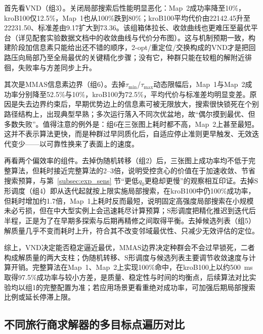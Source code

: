 \documentclass[lettersize,journal]{IEEEtran}
\begin{document}
首先看VND（组3）。关闭局部搜索后性能明显恶化：Map~2成功率降至10\%，kroB100仅12.5\%，Map~1也从100\%跌到80\%；kroB100平均代价由22142.45升至22231.50、标准差由9.17扩大到73.36。该组箱体拉长、收敛曲线也更难压至最优平台（详见配套实验数据文档中的收敛曲线与代价分布图）。这与机制预期一致，构建阶段加信息素只能给出还不错的顺序，2-opt/重定位/交换构成的VND才是把回路压向局部乃至全局最优的关键精化步骤；没有它，种群只能在较粗的解附近徘徊，失败率与方差同步上升。

其次是MMAS信息素边界（组6）。去掉$\tau_{\min}$/$\tau_{\max}$动态限幅后，Map~1与Map~2成功率分别降至52.5\%与10\%，kroB100为72.5\%，平均代价与标准差均明显变差。原因是失去边界约束后，早期优势边上的信息素可被无限放大，搜索很快锁死在个别路径结构上，出现典型早熟；多次运行落入不同次优盆地，故“偶尔摸到最优、但多数失败”。值得注意的例外是：组6在三张图上耗时都不高，Map~2上甚至最短。这并不表示算法更快，而是种群过早同质化后，自适应停止准则更早触发、无效迭代变少——以可靠性换来了表面上的速度。

再看两个偏效率的组件。去掉伪随机转移（组2）后，三张图上成功率均不低于完整算法，但耗时接近完整算法的2--3倍，说明受控贪心的价值在于加速收敛、节省搜索预算，与第~\textcolor{blue}{\ref{subsec:exp_sens}} 节“更低$q_0$更稳却更慢”的观察相互印证。去掉S形调度（组4）即从迭代起就按上限实施局部搜索，在kroB100中仍100\%成功率，但耗时增加约1.7倍，Map~1上耗时反而最短，说明固定高强度局部搜索在小规模未必亏损，但在中大型实例上会迅速耗尽计算预算；S形调度把精化推迟到迭代后半程，正是为了在早期多探索与后期再精修之间取得平衡。去掉候选列表（组5）解质量几乎不变而耗时上升，符合其不改变邻域最优性、只减少无效评估的定位。

综上，VND决定能否稳定逼近最优，MMAS边界决定种群会不会过早锁死，二者构成解质量的两大支柱；伪随机转移、S形调度与候选列表主要调节收敛速度与计算开销。完整算法在Map~1、Map~2上实现100\%命中，在kroB100上以约500~ms取得97.5\%成功率与较小方差，是质量、稳定性与时间的均衡点，后续算法对比实验均以组1的完整配置为准；若应用场景更看重绝对成功率，可加强后期局部搜索比例或延长停滞上限。


\subsection{不同旅行商求解器的多目标点遍历对比}

\label{subsec:exp_cmp}
\end{document}
